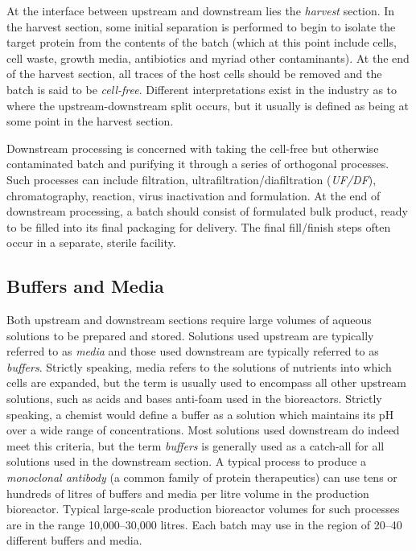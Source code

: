 At the interface between upstream and downstream lies the \emph{harvest}
section. In the harvest section, some initial separation is performed to begin
to isolate the target protein from the contents of the batch (which at this
point include cells, cell waste, growth media, antibiotics and myriad other
contaminants).  At the end of the harvest section, all traces of the host cells
should be removed and the batch is said to be \emph{cell-free}.  Different
interpretations exist in the industry as to where the upstream-downstream split
occurs, but it usually is defined as being at some point in the harvest section.

Downstream processing is concerned with taking the cell-free but otherwise 
contaminated batch and purifying it through a series of orthogonal processes.
Such processes can include filtration, ultrafiltration/diafiltration 
(\emph{UF/DF}), chromatography, reaction, virus inactivation and formulation.
At the end of downstream processing, a batch should consist of formulated bulk
product, ready to be filled into its final packaging for delivery. The final 
fill/finish steps often occur in a separate, sterile facility.

\subsection{Buffers and Media}\label{SS.buffmed}

Both upstream and downstream sections require large volumes of aqueous solutions
to be prepared and stored.  Solutions used upstream are typically referred to as
\emph{media} and those used downstream are typically referred to as
\emph{buffers}.  Strictly speaking, media refers to the solutions of nutrients
into which cells are expanded, but the term is usually used to encompass all
other upstream solutions, such as acids and bases anti-foam used in the
bioreactors.  Strictly speaking, a chemist would define a buffer as a solution
which maintains its pH over a wide range of concentrations.  Most solutions used
downstream do indeed meet this criteria, but the term \emph{buffers} is
generally used as a catch-all for all solutions used in the downstream section.
A typical process to produce a \emph{monoclonal antibody} (a common family of 
protein therapeutics) can use tens or hundreds of litres of buffers and media 
per litre volume in the production bioreactor.  Typical large-scale production
bioreactor volumes for such processes are in the range 10,000--30,000 litres.
Each batch may use in the region of 20--40 different buffers and media.


